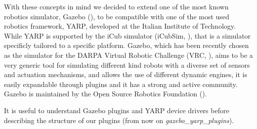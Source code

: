 With these concepts in mind we decided to extend one of the most known robotics simulator, Gazebo (\cite{koenig2004design}), to be compatible with one of the most used robotics framework, YARP, developed at the Italian Institute of Technology. 
While YARP is supported by the iCub simulator (iCubSim, \cite{Tikhanoff:2008:OSC:1774674.1774684}), that is a simulator specificly tailored to a specific platform. 
Gazebo, which has been recently chosen as the simulator for the DARPA Virtual Robotic Challenge (VRC, \cite{DRC}), aims to be a very generic tool for simulating different kind robots with a diverse set of sensors and actuation mechanisms, and allows the use of different dynamic engines, it is easily expandable through plugins and it has a strong and active community. Gazebo is maintained by the Open Source Robotics Foundation (\cite{OSRF}).

\label{structure}
It is useful to understand Gazebo plugins and YARP device drivers before describing the structure of our plugins (from now on \emph{gazebo\_yarp\_plugins}).

